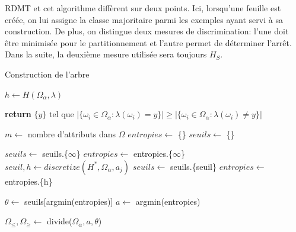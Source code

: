 \documentclass[a4paper]{article}
\begin{document}
RDMT et cet algorithme diffèrent sur deux points. Ici, lorsqu'une feuille est
créée, on lui assigne la classe majoritaire parmi les exemples ayant servi à sa
construction. De plus, on distingue deux mesures de discrimination: l'une doit
être minimisée pour le partitionnement et l'autre permet de déterminer l'arrêt.
Dans la suite, la deuxième mesure utilisée sera toujours $H_S$.

\begin{algorithm}[H]
\caption{Construction de l'arbre}
\label{alg:build-tree}
\begin{algorithmic}
\State {}
\State {}
\State {}
\State {}
\State {}
\State {}
\State {}
\State {}

\State $h \gets H(\Omega_{\alpha}, \lambda)$

	\State \textbf{return} $\{y\}$ tel que $|\{\omega_i \in \Omega_{\alpha}: \lambda(\omega_i) = y\}| \geq |\{\omega_i \in \Omega_{\alpha}: \lambda(\omega_i) \neq y\}|$
\EndIf

\State $m\gets$ nombre d'attributs dans $\Omega$
\State $entropies\gets$ \{\}
\State $seuils\gets$ \{\}

    	\State $seuils \gets$ seuils.\{$\infty$\}
    	\State $entropies \gets$ entropies.\{$\infty$\}
    \Else
        \State $seuil, h \gets discretize(H^*, \Omega_{\alpha}, a_j) $
        \State $seuils \gets$ seuils.\{seuil\}
        \State $entropies \gets$ entropies.\{h\}
    \EndIf
\EndFor

\State $\theta \gets$ seuils[argmin(entropies)]
\State $a\gets$ argmin(entropies)

\State $\Omega_{\leq}, \Omega_{\geq}\gets$ divide($\Omega_{\alpha}, a, \theta$) 


\end{algorithmic}
\end{algorithm}
\end{document}
